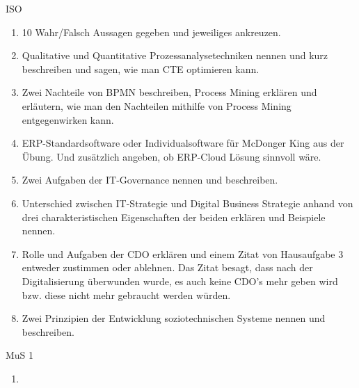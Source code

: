 \documentclass{article}
\begin{document}
\begin{exercise}{ISO}
  \begin{enumerate}
    \item 10 Wahr/Falsch Aussagen gegeben und jeweiliges ankreuzen.
    \item Qualitative und Quantitative Prozessanalysetechniken nennen und kurz beschreiben und sagen, wie man CTE optimieren kann.
    \item Zwei Nachteile von BPMN beschreiben, Process Mining erklären und erläutern, wie man den Nachteilen mithilfe von Process Mining entgegenwirken kann.
    \item ERP-Standardsoftware oder Individualsoftware für McDonger King aus der Übung. Und zusätzlich angeben, ob ERP-Cloud Lösung sinnvoll wäre.
    \item Zwei Aufgaben der IT-Governance nennen und beschreiben.
    \item Unterschied zwischen IT-Strategie und Digital Business Strategie anhand von drei charakteristischen Eigenschaften der beiden erklären und Beispiele nennen.
    \item Rolle und Aufgaben der CDO erklären und einem Zitat von Hausaufgabe 3 entweder zustimmen oder ablehnen. Das Zitat besagt, dass nach der Digitalisierung überwunden wurde, es auch keine CDO's mehr geben wird bzw. diese nicht mehr gebraucht werden würden.
    \item Zwei Prinzipien der Entwicklung soziotechnischen Systeme nennen und beschreiben.
  \end{enumerate}
\end{exercise}

\begin{exercise}{MuS 1}
  \begin{enumerate}
    \item
  \end{enumerate}
\end{exercise}



\end{document}
